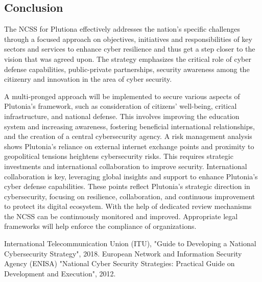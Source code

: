 \documentclass[
	a4paper, %
	10pt, %
]{CSSullivanBusinessReport}
\begin{document}
\begin{fullwidth}
\begin{justify}
\section{Conclusion}
The NCSS for Plutiona effectively addresses the nation's specific challenges through a focused approach on objectives, initiatives and responsibilities of key sectors and services to enhance cyber resilience and thus get a step closer to the vision that was agreed upon. The strategy emphasizes the critical role of cyber defense capabilities, public-private partnerships, security awareness among the citizenry and innovation in the area of cyber security.

A multi-pronged approach will be implemented to secure various aspects of Plutonia’s framework, such as consideration of citizens' well-being, critical infrastructure, and national defense. This involves improving the education system and increasing awareness, fostering beneficial international relationships, and the creation of a central cybersecurity agency. A risk management analysis shows Plutonia's reliance on external internet exchange points and proximity to geopolitical tensions heightens cybersecurity risks. This requires strategic investments and international collaboration to improve security. International collaboration is key, leveraging global insights and support to enhance Plutonia’s cyber defense capabilities. These points reflect Plutonia's strategic direction in cybersecurity, focusing on resilience, collaboration, and continuous improvement to protect its digital ecosystem. With the help of dedicated review mechanisms the NCSS can be continuously monitored and improved. Appropriate legal frameworks will help enforce the compliance of organizations.
\end{justify}


\begin{thebibliography}{9}
International Telecommunication Union (ITU), "Guide to Developing a National Cybersecurity Strategy", 2018.
European Network and Information Security Agency (ENISA) "National Cyber Security Strategies: Practical Guide on Development and Execution", 2012.
\end{thebibliography}

\end{fullwidth}
\end{document}
